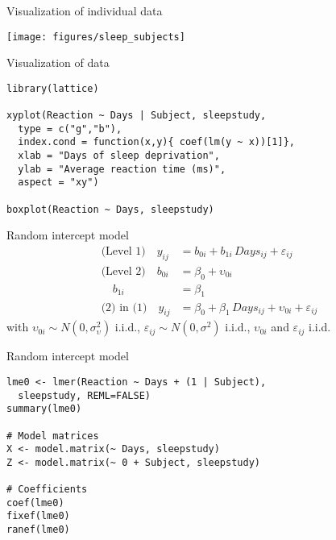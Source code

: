 \documentclass{beamer}
\begin{document}
\begin{frame}{Visualization of individual data}
  \begin{center}
      \texttt{[image: figures/sleep\_subjects]}
  \end{center}
\end{frame}

{

\begin{frame}[fragile]{Visualization of data}
\begin{lstlisting}
library(lattice)

xyplot(Reaction ~ Days | Subject, sleepstudy,
  type = c("g","b"),
  index.cond = function(x,y){ coef(lm(y ~ x))[1]},
  xlab = "Days of sleep deprivation",
  ylab = "Average reaction time (ms)",
  aspect = "xy")

boxplot(Reaction ~ Days, sleepstudy)
\end{lstlisting}
\end{frame}

}

\begin{frame}{Random intercept model}
\begin{align*}
\text{(Level 1)}  \quad y_{ij} &= b_{0i} + b_{1i}\,Days_{ij} + \varepsilon_{ij}\\
\text{(Level 2)}  \quad b_{0i} &= \beta_0 + \upsilon_{0i}\\
                  \quad b_{1i} &= \beta_1\\
\text{(2) in (1)} \quad y_{ij} &= \beta_0 + \beta_1\,Days_{ij} +
                                  \upsilon_{0i} + \varepsilon_{ij}
\end{align*}
with $\upsilon_{0i} \sim N(0, \sigma^2_{\upsilon})$ i.i.d.,
$\varepsilon_{ij} \sim N(0, \sigma^2)$ i.i.d., $\upsilon_{0i}$ and
$\varepsilon_{ij}$ i.i.d.\\[2ex]
\end{frame}

{

\begin{frame}[fragile]{Random intercept model}
\begin{lstlisting}
lme0 <- lmer(Reaction ~ Days + (1 | Subject),
  sleepstudy, REML=FALSE)
summary(lme0)

# Model matrices
X <- model.matrix(~ Days, sleepstudy)
Z <- model.matrix(~ 0 + Subject, sleepstudy)

# Coefficients
coef(lme0)
fixef(lme0)
ranef(lme0)
\end{lstlisting}
\end{frame}

}
\end{document}
